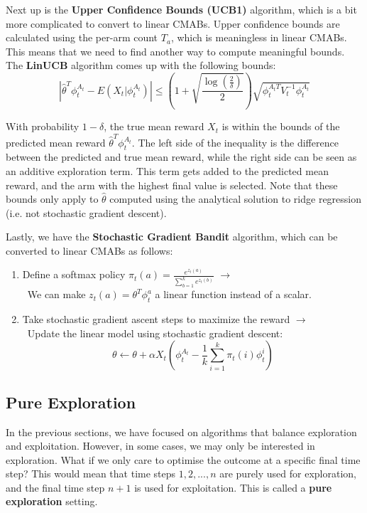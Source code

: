 \documentclass[12pt]{article}
\begin{document}
\noindent
Next up is the \textbf{Upper Confidence Bounds (UCB1)} algorithm, which is a bit more complicated to convert to linear CMABs.
Upper confidence bounds are calculated using the per-arm count $T_a$, which is meaningless in linear CMABs.
This means that we need to find another way to compute meaningful bounds.
The \textbf{LinUCB} algorithm comes up with the following bounds:
\[ \left\lvert \hat{\theta}^T \phi_t^{A_t} - E\left( X_t | \phi_t^{A_t} \right) \right\rvert \leq \left( 1 + \sqrt{\frac{\log \left( \frac{2}{\delta} \right)}{2}} \right) \sqrt{\phi_t^{A_t T} V_t^{-1} \phi_t^{A_t}}  \]

\noindent
With probability $1 - \delta$, the true mean reward $X_t$ is within the bounds of the predicted mean reward $\hat{\theta}^T \phi_t^{A_t}$.
The left side of the inequality is the difference between the predicted and true mean reward, while the right side can be seen as an additive exploration term.
This term gets added to the predicted mean reward, and the arm with the highest final value is selected.
Note that these bounds only apply to $\hat{\theta}$ computed using the analytical solution to ridge regression (i.e. not stochastic gradient descent).

\newpage
\noindent
Lastly, we have the \textbf{Stochastic Gradient Bandit} algorithm, which can be converted to linear CMABs as follows:

\begin{enumerate}
    \item Define a softmax policy $\displaystyle \pi_t(a) = \frac{e^{z_t(a)}}{\sum_{b = 1}^k e^{z_t(b)}}$ $\rightarrow$\\ \-\, We can make $z_t(a) = \theta^T \phi_t^a$ a linear function instead of a scalar.
    \item Take stochastic gradient ascent steps to maximize the reward $\rightarrow$\\ \-\, Update the linear model using stochastic gradient descent:
    \[ \theta \leftarrow \theta + \alpha X_t \left( \phi_t^{A_t} - \frac{1}{k} \sum_{i = 1}^k \pi_t(i)\phi_t^i \right) \]
\end{enumerate}

\subsection{Pure Exploration}
In the previous sections, we have focused on algorithms that balance exploration and exploitation.
However, in some cases, we may only be interested in exploration.
What if we only care to optimise the outcome at a specific final time step?
This would mean that time steps $1, 2, ... , n$ are purely used for exploration, and the final time step $n + 1$ is used for exploitation.
This is called a \textbf{pure exploration} setting.
\end{document}
